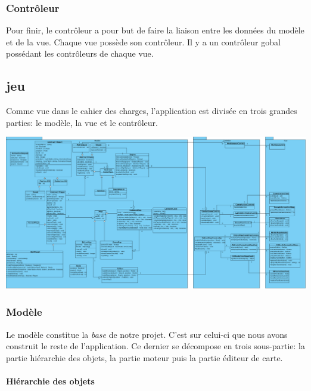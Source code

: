 	\subsubsection*{Contrôleur}
		
		Pour finir, le contrôleur a pour but de faire la liaison entre les 
		données du modèle et de la vue.
		Chaque vue possède son contrôleur.
		Il y a un contrôleur gobal possédant les contrôleurs de chaque vue.
			

	\subsection{jeu}
	
	Comme vue dans le cahier des charges, l'application est divisée en 
	trois grandes parties: le modèle, la vue et le contrôleur.
	
	\begin{center}
		\includegraphics[scale=0.41, angle=90]{./Analyse/Img/BomberblocDiagramme.eps}
	\end{center}
	
	\subsubsection{Modèle}
	
		Le modèle constitue la \textit{base} de notre projet.
		C'est sur celui-ci que nous avons construit le reste de l'application.
		Ce dernier se décompose en trois sous-partie: la partie hiérarchie des objets, la partie moteur puis la partie éditeur de carte.\\
		
	\paragraph{Hiérarchie des objets \\}
	
